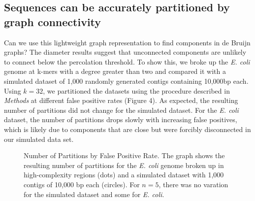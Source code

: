 \documentclass[12pt]{article} \usepackage{simplemargins}
\begin{document}
\subsection{Sequences can be accurately partitioned by graph connectivity}

Can we use this lightweight graph representation to find 
components in de Bruijn graphs?
The diameter results suggest that unconnected
components are unlikely to connect below the percolation threshold. To
show this, we broke up the \emph{E. coli} genome at k-mers with a
degree greater than two and compared it with a simulated dataset of
1,000 randomly generated contigs containing 10,000bp each. Using
$k=32$, we partitioned the datasets using the procedure described in
\emph{Methods} at different false positive rates (Figure 4). As
expected, the resulting number of partitions did not change for the
simulated dataset. For the \emph{E. coli} dataset, the number of
partitions drops slowly with increasing false positives, which is
likely due to components that are close but were forcibly disconnected
in our simulated data set.

\begin{figure}
\caption{Number of Partitions by False Positive Rate. The 
graph shows the resulting number of partitions for the 
\emph{E. coli} genome broken up in high-complexity regions (dots) and 
a simulated dataset with 1,000 contigs of 10,000 bp each (circles). For $n=5$, 
there was no varation for the simulated dataset and some for 
\emph{E. coli}.}
\end{figure}
\end{document}
